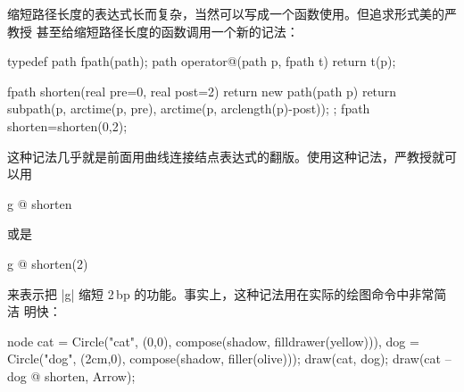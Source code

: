 缩短路径长度的表达式长而复杂，当然可以写成一个函数使用。但追求形式美的严教授
甚至给缩短路径长度的函数调用一个新的记法：
\begin{asycode}
typedef path fpath(path);
path operator@(path p, fpath t)
{
    return t(p);
}

fpath shorten(real pre=0, real post=2)
{
    return new path(path p) {
	return subpath(p, arctime(p, pre), arctime(p, arclength(p)-post));
    };
}
fpath shorten=shorten(0,2);
\end{asycode}
这种记法几乎就是前面用曲线连接结点表达式的翻版。使用这种记法，严教授就可以用
\begin{asycode}
g @ shorten
\end{asycode}
或是
\begin{asycode}
g @ shorten(2)
\end{asycode}
来表示把 |g| 缩短 2\,bp 的功能。事实上，这种记法用在实际的绘图命令中非常简洁
明快：
\begin{asycode}
node cat = Circle("cat", (0,0), compose(shadow, filldrawer(yellow))),
     dog = Circle("dog", (2cm,0), compose(shadow, filler(olive)));
draw(cat, dog);
draw(cat -- dog @ shorten, Arrow);
\end{asycode}
